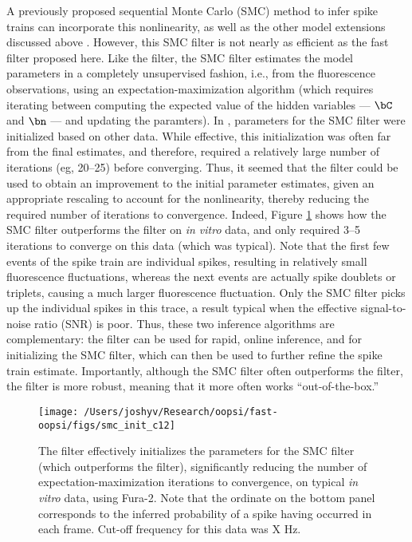 A previously proposed sequential Monte Carlo (SMC) method to infer spike trains can incorporate this nonlinearity, as well as the other model extensions discussed above \cite{VogelsteinPaninski09} . However, this SMC filter is not nearly as efficient as the fast filter proposed here.  Like the \foopsi filter, the SMC filter estimates the model parameters in a completely unsupervised fashion, i.e.,  from the fluorescence observations, using an expectation-maximization algorithm (which requires iterating between computing the expected value of the hidden variables --- $\bC$ and $\bn$ --- and updating the paramters).  In \cite{VogelsteinPaninski09}, parameters for the SMC filter were initialized based on other data.  While effective, this initialization was often far from the final estimates, and therefore, required a relatively large number of iterations (eg, 20--25) before converging.  Thus, it seemed that the \foopsi filter could be used to obtain an improvement to the initial parameter estimates, given an appropriate rescaling to account for the nonlinearity, thereby reducing the required number of iterations to convergence.  Indeed, Figure \ref{fig:smc_init} shows how the SMC filter outperforms the \foopsi filter on \emph{in vitro} data, and only required 3--5 iterations to converge on this data (which was typical).  Note that the first few events of the spike train are individual spikes, resulting in relatively small fluorescence fluctuations, whereas the next events are actually spike doublets or triplets, causing a much larger fluorescence fluctuation.  Only the SMC filter picks up the individual spikes in this trace, a result typical when the effective signal-to-noise ratio (SNR) is poor.  Thus, these two inference algorithms are complementary: the \foopsi filter can be used for rapid, online inference, and for initializing the SMC filter, which can then be used to further refine the spike train estimate.  Importantly, although the SMC filter often outperforms the \foopsi filter, the \foopsi filter is more robust, meaning that it more often works ``out-of-the-box.''

\begin{figure}[h!]
\centering \texttt{[image: /Users/joshyv/Research/oopsi/fast-oopsi/figs/smc\_init\_c12]}
\caption[\foopsi filter can initialize Wiener filter]{The \foopsi filter effectively initializes the parameters for the SMC filter (which outperforms the \foopsi filter), significantly reducing the number of expectation-maximization iterations to convergence, on typical \emph{in vitro} data, using Fura-2.  Note that the ordinate on the bottom panel corresponds to the inferred probability of a spike having occurred in each frame. Cut-off frequency for this data was X Hz.} \label{fig:smc_init}
\end{figure}

